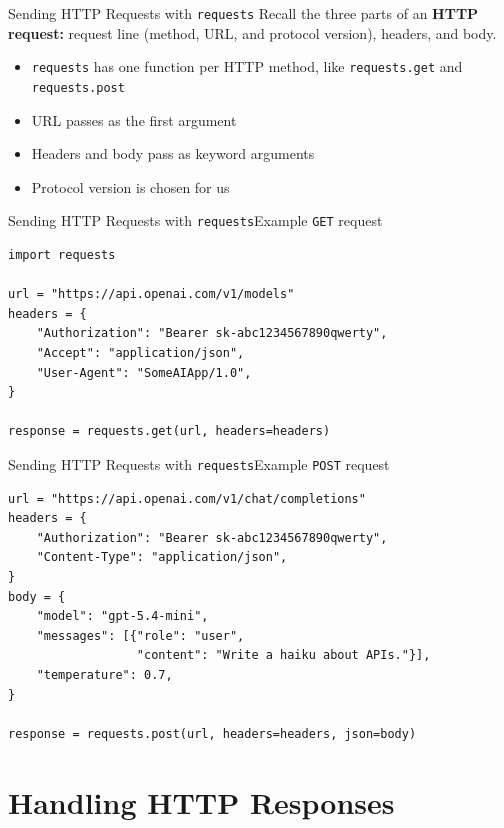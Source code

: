 \documentclass[aspectratio=169]{beamer}
\begin{document}
\begin{frame}{Sending HTTP Requests with \texttt{requests}}
  Recall the three parts of an \textbf{HTTP request:} request line (method, URL, and protocol version), headers, and body.

    \begin{itemize}
        \item \texttt{requests} has one function per HTTP method, like \texttt{requests.get} and \texttt{requests.post}
        \item URL passes as the first argument
        \item Headers and body pass as keyword arguments
        \item Protocol version is chosen for us
    \end{itemize}
\note{
}
\end{frame}


\begin{frame}[fragile]{Sending HTTP Requests with \texttt{requests}}{Example \texttt{GET} request}
    \begin{verbatim}
import requests

url = "https://api.openai.com/v1/models"
headers = {
    "Authorization": "Bearer sk-abc1234567890qwerty",
    "Accept": "application/json",
    "User-Agent": "SomeAIApp/1.0",
}

response = requests.get(url, headers=headers)
    \end{verbatim}
\note{
}
\end{frame}


\begin{frame}[fragile]{Sending HTTP Requests with \texttt{requests}}{Example \texttt{POST} request}
    \begin{verbatim}
url = "https://api.openai.com/v1/chat/completions"
headers = {
    "Authorization": "Bearer sk-abc1234567890qwerty",
    "Content-Type": "application/json",
}
body = {
    "model": "gpt-5.4-mini",
    "messages": [{"role": "user",
                  "content": "Write a haiku about APIs."}],
    "temperature": 0.7,
}

response = requests.post(url, headers=headers, json=body)
    \end{verbatim}
\note{
}
\end{frame}



\section{Handling HTTP Responses}
\end{document}
